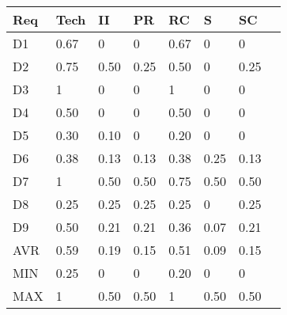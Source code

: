 \begin{tabularx}{\columnwidth}{|l|X|X|X|X|X|X|X|}
\hline
Req	& Tech & II   & PR   & RC   & S    & SC	   \\\hline
D1	& 0.67 & 0    & 0    & 0.67 & 0    & 0     \\\hline
D2	& 0.75 & 0.50 & 0.25 & 0.50 & 0    & 0.25  \\\hline
D3	& 1    & 0    & 0    & 1    & 0    & 0     \\\hline
D4	& 0.50 & 0    & 0    & 0.50 & 0    & 0     \\\hline
D5	& 0.30 & 0.10 & 0    & 0.20 & 0    & 0     \\\hline
D6	& 0.38 & 0.13 & 0.13 & 0.38 & 0.25 & 0.13  \\\hline
D7	& 1    & 0.50 & 0.50 & 0.75 & 0.50 & 0.50  \\\hline
D8	& 0.25 & 0.25 & 0.25 & 0.25 & 0    & 0.25  \\\hline
D9	& 0.50 & 0.21 & 0.21 & 0.36 & 0.07 & 0.21  \\\hline
AVR	& 0.59 & 0.19 & 0.15 & 0.51 & 0.09 & 0.15  \\\hline
MIN	& 0.25 & 0    & 0    & 0.20 & 0    & 0     \\\hline
MAX	& 1    & 0.50 & 0.50 & 1    & 0.50 & 0.50  \\\hline
\end{tabularx}